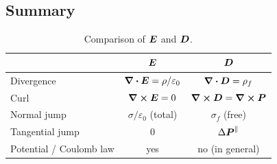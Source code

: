 \subsection{Summary}

\begin{table}[ht]
\centering
\renewcommand{\arraystretch}{1.5}
\begin{tabular}{l|c|c}
    & $\vect{E}$ & $\vect{D}$\\\hline
    Divergence & $\div\vect{E} = \rho/\varepsilon_0$ & $\div\vect{D} = \rho_f$\\
    Curl & $\curl\vect{E} = 0$ & $\curl\vect{D} = \curl\vect{P}$\\
    Normal jump & $\sigma/\varepsilon_0$ (total) & $\sigma_f$ (free)\\
    Tangential jump & $0$ & $\Delta\vect{P}^\parallel$\\
    Potential / Coulomb law & yes & no (in general)
\end{tabular}
\caption{Comparison of $\vect{E}$ and $\vect{D}$.}
\label{tab:em-e-vs-d}
\end{table}
